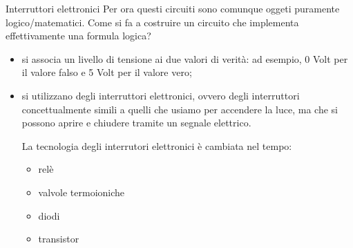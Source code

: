 \documentclass[aspectratio=169,10pt,dvipsnames,xcolor=table,handout]{beamer}
\begin{document}
\begin{frame}{Interruttori elettronici}
    Per ora questi circuiti sono comunque oggeti puramente logico/matematici. Come si fa a costruire un circuito che implementa effettivamente una formula logica?
    \begin{itemize}
        \item si associa un livello di tensione ai due valori di verità: ad esempio, 0 Volt per il valore falso e 5 Volt per il valore vero;
        \item si utilizzano degli \alert{interruttori elettronici}, ovvero degli interruttori concettualmente simili a quelli che usiamo per accendere la luce, ma che si possono aprire e chiudere tramite un segnale elettrico.

        \medskip
        La tecnologia degli interrutori elettronici è cambiata nel tempo:
        \begin{itemize}
            \item relè
            \item valvole termoioniche
            \item diodi
            \item transistor
        \end{itemize}
    \end{itemize}
\end{frame}
\end{document}
